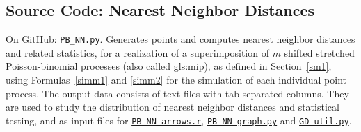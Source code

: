 \documentclass[10pt]{article}
\begin{document}
\subsection{Source Code: Nearest Neighbor Distances}\label{nnsc}

{On GitHub}: \href{https://github.com/VincentGranville/Point-Processes/blob/main/Source\%20Code/PB_NN.py}{\texttt{PB\_NN.py}}. Generates points and computes \textcolor{index}{nearest neighbor distances} and related statistics, for a realization of a superimposition
of $m$ shifted stretched Poisson-binomial processes (also called \gls{gls:mip}), as defined in Section~\ref{sm1}, using Formulas~\ref{simm1} and
\ref{simm2} for the simulation of each individual point process. The output data consists of text files with tab-separated columns. They are used to study the distribution of nearest neighbor distances and statistical testing,
and as input files for
    \href{https://github.com/VincentGranville/Point-Processes/blob/main/Source\%20Code/PP_NN_arrows.r}{\texttt{PB\_NN\_arrows.r}},
    \href{https://github.com/VincentGranville/Point-Processes/blob/main/Source\%20Code/PB_NN_graph.py}{\texttt{PB\_NN\_graph.py}} and
    \href{https://github.com/VincentGranville/Point-Processes/blob/main/Source\%20Code/GD_util.py}{\texttt{GD\_util.py}}.
\end{document}
